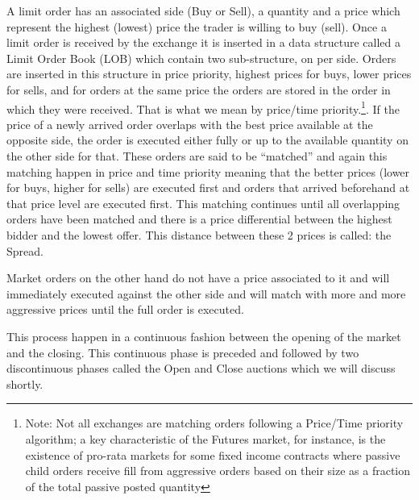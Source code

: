 A limit order has an associated side (Buy or Sell), a quantity and a price which represent the highest (lowest) price the trader is willing to buy (sell). Once a limit order is received by the exchange it is inserted in a data structure called a Limit Order Book (LOB) which contain two sub-structure, on per side. Orders are inserted in this structure in price priority, highest prices for buys, lower prices for sells, and for orders at the same price the orders are stored in the order in which they were received. That is what we mean by price/time priority.\footnote{Note: Not all exchanges are matching orders following a Price/Time priority algorithm; a key characteristic of the Futures market, for instance, is the existence of pro-rata markets for some fixed income contracts where passive child orders receive fill from aggressive orders based on their size as a fraction of the total passive posted quantity}. If the price of a newly arrived order overlaps with the best price available at the opposite side, the order is executed either fully or up to the available quantity on the other side for that. These orders are said to be ``matched'' and again this matching happen in price and time priority meaning that the better prices (lower for buys, higher for sells) are executed first and orders that arrived beforehand at that price level are executed first.  This matching continues until all overlapping orders have been matched and there is a price differential between the highest bidder and the lowest offer. This distance between these 2 prices is called: the Spread.


Market orders on the other hand do not have a price associated to it and will immediately executed against the other side and will match with more and more aggressive prices until the full order is executed.




This process happen in a continuous fashion between the opening of the market and the closing. This continuous phase is preceded and followed by two discontinuous phases called the Open and Close auctions which we will discuss shortly.


